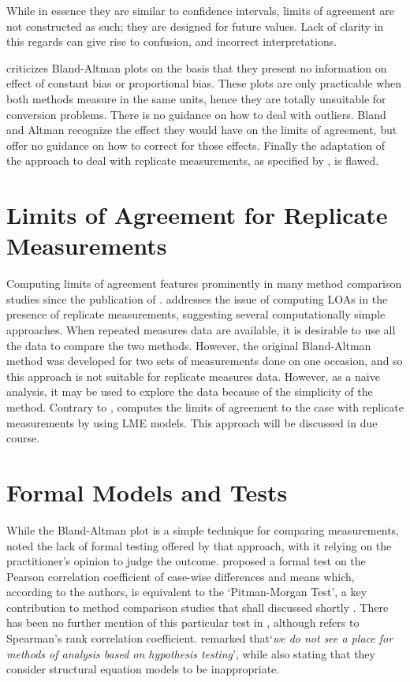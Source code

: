 \documentclass[12pt, a4paper]{report}
\theoremstyle{plain}
\theoremstyle{definition}
\theoremstyle{remark}
\begin{document}
While in essence they are similar to confidence intervals, limits of agreement are not constructed as such; they are designed for future values. Lack of clarity in this regards can give rise to confusion, and incorrect interpretations.

\citet{ludbrook97,ludbrook02} criticizes Bland-Altman plots on the basis that they present no information on effect of constant bias or proportional bias. These plots are only practicable when both methods measure in the same units, hence they are totally
unsuitable for conversion problems. There is no guidance on how to deal with outliers. Bland and Altman recognize the effect they would have on the limits of agreement, but offer no guidance on how to correct for those effects. Finally the adaptation of the approach to deal with replicate measurements, as specified by \citet{BA99}, is flawed.

\section{Limits of Agreement for Replicate Measurements}

Computing limits of agreement features prominently in many method comparison studies since the publication of \citet{BA86}.
\citet{BA99} addresses the issue of computing LOAs in the presence of replicate measurements, suggesting several computationally simple approaches. When repeated measures data are available, it is desirable to use
all the data to compare the two methods. However, the original Bland-Altman method was developed for two sets of measurements done on one occasion, and so this approach is not suitable for replicate measures data. However, as a naive analysis, it may be used to explore the data because of the simplicity of the method.
Contrary to \citet{BA99}, \citet{BXC2008} computes the limits of agreement to the case with replicate measurements by using LME models. This approach will be discussed in due course.




\section{Formal Models and Tests}
While the Bland-Altman plot is a simple technique for comparing measurements, \citet{Kinsella} noted the lack of formal testing offered by
that approach, with it relying on the practitioner's opinion to judge the outcome. \citet{BA83} proposed a formal test on the
Pearson correlation coefficient of case-wise differences and means which, according to the authors, is equivalent
to the `Pitman-Morgan Test', a key contribution to method comparison studies that shall discussed shortly \citep{morgan, pitman}. There has been no further mention of this particular test in
\citet{BA86}, although \citet{BA99} refers to Spearman's rank
correlation coefficient. \citet{BA99} remarked that`\textit{we do not see a
	place for methods of analysis based on hypothesis testing}', while also stating that they consider structural equation models to be inappropriate.
\end{document}
